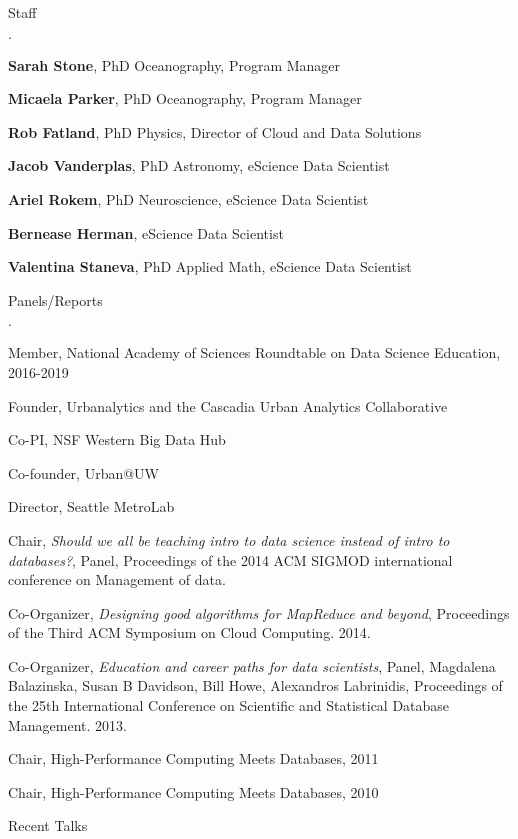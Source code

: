 \documentclass[10pt]{article}
\newenvironment{bulletlist}
   {
      \begin{list}
         {$\cdot$}
         {
            \setlength{\itemsep}{.7ex}
            \setlength{\parsep}{0ex}
            \setlength{\leftmargin}{0.7em}
            \setlength{\parskip}{0ex}
            \setlength{\topsep}{0ex}
         }
   }
   {
      \end{list}
   }
\newcommand{\marginlabel}[1]{
\begin{minipage}[b]{0.8\labelwidth}{\large \textsf{\textbf{#1}}}\end{minipage}}
\newcommand{\entrylabel}[1]{\mbox{\marginlabel{#1}}\hfill}
\newcommand{\MainListlabel}[1]
   {
      \parbox[t]{\labelwidth}{\hspace{.8em}\marginlabel{#1}}
   }
\newenvironment{MainList}[1]
   {
      \renewcommand{\entrylabel}{\MainListlabel}
      \begin{list}{}
      {
         \renewcommand{\makelabel}{\entrylabel}
         \setlength   {\itemindent}{-.65em}
         \setlength   {\labelwidth}{#1}
         \setlength   {\leftmargin}{\labelwidth}
         \setlength   {\itemsep}{3ex}
      }
   }
   {
      \end{list}
   }
\begin{document}
\begin{MainList}{88pt}
\item [Staff]
\begin{bulletlist}
\item {\bf Sarah Stone}, PhD Oceanography, Program Manager
\item {\bf Micaela Parker}, PhD Oceanography, Program Manager
\item {\bf Rob Fatland}, PhD Physics, Director of Cloud and Data Solutions
\item {\bf Jacob Vanderplas}, PhD Astronomy, eScience Data Scientist 
\item {\bf Ariel Rokem}, PhD Neuroscience, eScience Data Scientist 
\item {\bf Bernease Herman}, eScience Data Scientist
\item {\bf Valentina Staneva}, PhD Applied Math, eScience Data Scientist
\end{bulletlist}


\item [Panels/Reports]
\begin{bulletlist}
\item Member, National Academy of Sciences Roundtable on Data Science Education, 2016-2019
\item Founder, Urbanalytics and the Cascadia Urban Analytics Collaborative
\item Co-PI, NSF Western Big Data Hub
\item Co-founder, Urban@UW
\item Director, Seattle MetroLab
\item Chair, {\em Should we all be teaching intro to data science instead of intro to databases?}, Panel, Proceedings of the 2014 ACM SIGMOD international conference on Management of data.
\item Co-Organizer, {\em Designing good algorithms for MapReduce and beyond}, Proceedings of the Third ACM Symposium on Cloud Computing. 2014.
\item Co-Organizer, {\em Education and career paths for data scientists}, Panel, Magdalena Balazinska, Susan B Davidson, Bill Howe, Alexandros Labrinidis, Proceedings of the 25th International Conference on Scientific and Statistical Database Management. 2013.
\item Chair, High-Performance Computing Meets Databases, 2011
\item Chair, High-Performance Computing Meets Databases, 2010
\end{bulletlist}

\item [Recent Talks]


\end{MainList}
\end{document}
